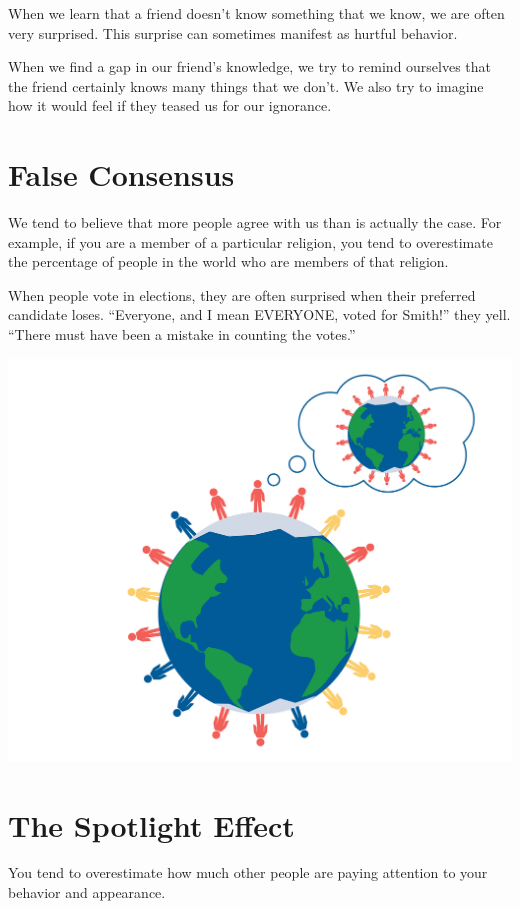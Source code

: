 When we learn that a friend doesn't know something that we know,
we are often very surprised. This surprise can sometimes manifest as
hurtful behavior.

When we find a gap in our friend's knowledge, we try to remind ourselves that
the friend certainly knows many things that we don't. We also try to
imagine how it would feel if they teased us for our ignorance.

\section{False Consensus}

We tend to believe that more people agree with us than is actually
the case. For example, if you are a member of a particular religion,
you tend to overestimate the percentage of people in the world who are
members of that religion.

When people vote in elections, they are often surprised when their
preferred candidate loses. ``Everyone, and I mean EVERYONE, voted for
Smith!'' they yell.  ``There must have been a mistake in counting the
votes.''

\includegraphics[width=1\textwidth]{falseConsensus.png}

\section{The Spotlight Effect}

You tend to overestimate how much other people are paying attention to
your behavior and appearance.

